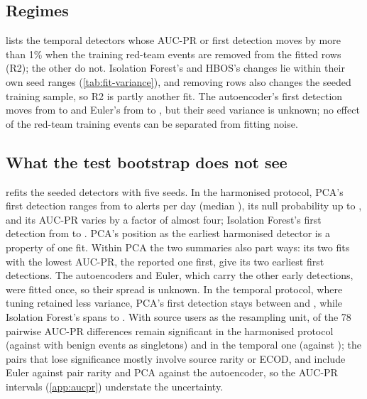 \documentclass[11pt,a4paper]{article}
\begin{document}
\subsection{Regimes}
 lists the temporal detectors whose AUC-PR or first detection moves by more than 1\% when the \TempTrainPositives{} training red-team events are removed from the fitted rows (R2); the other \RegimeUnchanged{} do not. Isolation Forest's and HBOS's changes lie within their own seed ranges (\cref{tab:fit-variance}), and removing rows also changes the seeded training sample, so R2 is partly another fit. The autoencoder's first detection moves from \TempAutoencoderFirstDetection{} to \TempTwoAutoencoderFirstDetection{} and Euler's from \TempEulerFirstDetection{} to \TempTwoEulerFirstDetection{}, but their seed variance is unknown; no effect of the red-team training events can be separated from fitting noise.

\subsection{What the test bootstrap does not see}
\label{sec:variance}
 refits the seeded detectors with five seeds. In the harmonised protocol, PCA's first detection ranges from \HarmPcaFitFirstMin{} to \HarmPcaFitFirstMax{} alerts per day (median \HarmPcaFitFirstMedian{}), its null probability up to \HarmPcaFitNullMax{}, and its AUC-PR varies by a factor of almost four; Isolation Forest's first detection from \HarmIForestFitFirstMin{} to \HarmIForestFitFirstMax{}. PCA's position as the earliest harmonised detector is a property of one fit. Within PCA the two summaries also part ways: its two fits with the lowest AUC-PR, the reported one first, give its two earliest first detections. The autoencoders and Euler, which carry the other early detections, were fitted once, so their spread is unknown. In the temporal protocol, where tuning retained less variance, PCA's first detection stays between \TempPcaFitFirstMin{} and \TempPcaFitFirstMax{}, while Isolation Forest's spans \TempIForestFitFirstMin{} to \TempIForestFitFirstMax{}. With source users as the resampling unit, \HarmUserClusterSignificant{} of the 78 pairwise AUC-PR differences remain significant in the harmonised protocol (against \HarmPairsSignificant{} with benign events as singletons) and \TempUserClusterSignificant{} in the temporal one (against \TempPairsSignificant{}); the pairs that lose significance mostly involve source rarity or ECOD, and include Euler against pair rarity and PCA against the autoencoder, so the AUC-PR intervals (\cref{app:aucpr}) understate the uncertainty.
\end{document}
